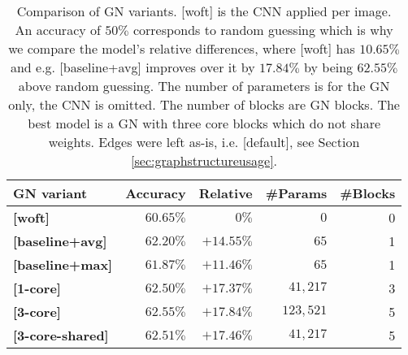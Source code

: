 \begin{table}
    \centering
    \begin{tabular}{lrrrr}
        \textbf{GN variant} & \textbf{Accuracy} & \textbf{Relative} & \textbf{\#Params} & \textbf{\#Blocks}\\\hline
        \textbf{[woft]}         & $60.65\%$ & $0\%$ & $0$ & 0 \\
        \textbf{[baseline+avg]} & $62.20\%$ & $+14.55\%$ & $65$ & 1\\
        \textbf{[baseline+max]} & $61.87\%$ & $+11.46\%$ & $65$ & 1\\
        \textbf{[1-core]}       & $62.50\%$ & $+17.37\%$ & $41,217$ & 3\\
        \textbf{[3-core]}       & $\bm{62.55\%}$ & $\bm{+17.84\%}$ & $123,521$ & 5\\
        \textbf{[3-core-shared]}& $62.51\%$ & $+17.46\%$ & $41,217$ & 5\\
    \end{tabular}
    \caption[Comparison of GN variants]{Comparison of GN variants. [woft] is the CNN applied per image. An accuracy of $50\%$ corresponds to random guessing which is why we compare the model's relative differences, where [woft] has $10.65\%$ and e.g. [baseline+avg] improves over it by $17.84\%$ by being $62.55\%$ above random guessing. The number of parameters is for the GN only, the CNN is omitted. The number of blocks are GN blocks. The best model is a GN with three core blocks which do not share weights. Edges were left as-is, i.e. [default], see Section \ref{sec:graphstructureusage}.}
    \label{tab:gnvariantscomparison}
\end{table}

